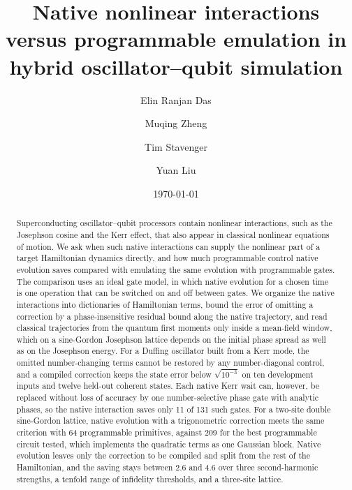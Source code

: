 \documentclass[pra,twocolumn,superscriptaddress,nofootinbib,floatfix]{revtex4-2}
\theoremstyle{remark}
\newcommand{\revcolor}{\color{blue}}
\DeclareRobustCommand{\rev}[1]{{\revcolor #1}}
\begin{document}
\title{Native nonlinear interactions versus programmable emulation in hybrid oscillator--qubit simulation}

\author{Elin Ranjan Das}
\author{Muqing Zheng}
\author{Tim Stavenger}
\author{Yuan Liu}

\date{\today}

\begin{abstract}
\rev{Superconducting oscillator--qubit processors contain nonlinear interactions, such as the Josephson cosine and the Kerr effect, that also appear in classical nonlinear equations of motion. We ask when such native interactions can supply the nonlinear part of a target Hamiltonian dynamics directly, and how much programmable control native evolution saves compared with emulating the same evolution with programmable gates. The comparison uses an ideal gate model, in which native evolution for a chosen time is one operation that can be switched on and off between gates. We organize the native interactions into dictionaries of Hamiltonian terms, bound the error of omitting a correction by a phase-insensitive residual bound along the native trajectory, and read classical trajectories from the quantum first moments only inside a mean-field window, which on a sine-Gordon Josephson lattice depends on the initial phase spread as well as on the Josephson energy. For a Duffing oscillator built from a Kerr mode, the omitted number-changing terms cannot be restored by any number-diagonal control, and a compiled correction keeps the state error below $\sqrt{10^{-3}}$ on ten development inputs and twelve held-out coherent states. Each native Kerr wait can, however, be replaced without loss of accuracy by one number-selective phase gate with analytic phases, so the native interaction saves only 11 of 131 such gates. For a two-site double sine-Gordon lattice, native evolution with a trigonometric correction meets the same criterion with 64 programmable primitives, against 209 for the best programmable circuit tested, which implements the quadratic terms as one Gaussian block. Native evolution leaves only the correction to be compiled and split from the rest of the Hamiltonian, and the saving stays between 2.6 and 4.6 over three second-harmonic strengths, a tenfold range of infidelity thresholds, and a three-site lattice.}
\end{abstract}

\maketitle
\end{document}
